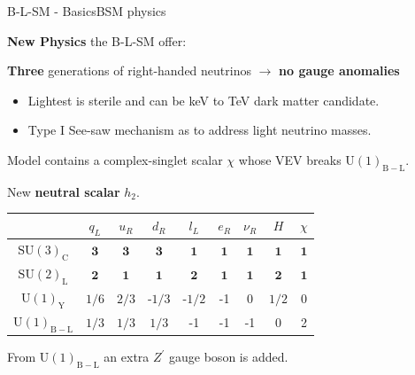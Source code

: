 \documentclass[10pt,xcolor=dvipsnames,mathserif]{beamer}
\newcommand{\U}[1]{\mathrm{U}(1)_{\mathrm{#1}}}			%
\newcommand{\blue}[0]{\color{blue}}
\newcommand{\red}[0]{\color{red}}
\begin{document}
    \begin{frame}{B-L-SM - Basics}{BSM physics}
        \begin{center}
            \textbf{New Physics} the B-L-SM offer: 
        \end{center}
        \vskip2mm
        \vskip3mm
		\textbf{Three} generations of right-handed neutrinos $\to$ \textbf{\red no gauge anomalies}
		\begin{itemize}
			\item Lightest is sterile and can be keV to TeV dark matter candidate. \\ %
			\item Type I See-saw mechanism as to address light neutrino masses.
		\end{itemize}
        \vskip3mm
        Model contains a complex-singlet scalar $\chi$ whose VEV breaks $\U{B-L}$. 
        \begin{itemize}
            {\item \blue New \textbf{neutral scalar} $h_2$.}
        \end{itemize}
        \begin{table}[h]
        \centering
        \begin{tabular}{|c|c|c|c|c|c|c|c|c|}
        \hline
        & $q_L$  & $u_R$ & $d_R$ & $l_L$  & $e_R$ & $\nu_R$  &  $H$  & $\chi$  \\ \hline
        $\mathrm{SU(3)_C}$& $\mathbf{3}$ & $\mathbf{3}$  & $\mathbf{3}$  & $\mathbf{1}$  & $\mathbf{1}$   & $\mathbf{1}$   & $\mathbf{1}$    & $\mathbf{1}$    \\
        $\mathrm{SU(2)_L}$& $\mathbf{2}$  & $\mathbf{1}$ & $\mathbf{1}$ & $\mathbf{2}$ & $\mathbf{1}$ & $\mathbf{1}$ & $\mathbf{2}$  & $\mathbf{1}$ \\
        $\mathrm{U(1)_Y}$ & ${1}/{6}$ & ${2}/{3}$  & -${1}/{3}$  & -${1}/{2}$ & -1 & 0 & ${1}/{2}$ & 0 \\
        $\mathrm{U(1)_{B-L}}$ & ${1}/{3}$ & ${1}/{3}$ & ${1}/{3}$  & -1  & -1 &-1  & 0 & 2  \\ \hline 
        \end{tabular}
        \end{table} 
        From $\U{B-L}$ an extra $Z^\prime$ gauge boson is added.
        \begin{itemize}

\end{itemize}
\end{frame}
\end{document}
